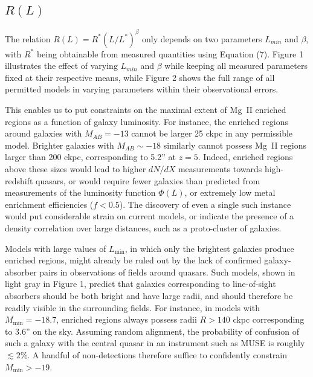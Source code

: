 \documentclass[useAMS,usenatbib]{mn2e}
\newcommand{\magtwo}{Mg~{\small II} }
\begin{document}
\subsection{$R(L)$}

The relation $R(L) = R^* (L/L^*)^\beta$ only depends on two parameters $L_{min}$ and $\beta$, with $R^*$ being obtainable from measured quantities using Equation (7). Figure 1 illustrates the effect of varying $L_{min}$ and $\beta$ while keeping all measured parameters fixed at their respective means, while Figure 2 shows the full range of all permitted models in varying parameters within their observational errors. 

This enables us to put constraints on the maximal extent of \magtwo enriched regions as a function of galaxy luminosity. For instance, the enriched regions around galaxies with $M_{AB} = -13$ cannot be larger 25 ckpc in any permissible model. Brighter galaxies with $M_{AB} \sim -18$ similarly cannot possess \magtwo regions larger than 200 ckpc, corresponding to 5.2'' at $z=5$. Indeed, enriched regions above these sizes would lead to higher $dN/dX$ measurements towards high-redshift quasars, or would require fewer galaxies than predicted from measurements of the luminosity function $\Phi(L)$, or extremely low metal enrichment efficiencies ($f<0.5$). The discovery of even a single such instance would put considerable strain on current models, or indicate the presence of a density correlation over large distances, such as a proto-cluster of galaxies.

Models with large values of $L_\text{min}$, in which only the brightest galaxies produce enriched regions, might already be ruled out by the lack of confirmed galaxy-absorber pairs in observations of fields around quasars. Such models, shown in light gray in Figure 1, predict that galaxies corresponding to line-of-sight absorbers should be both bright and have large radii, and should therefore be readily visible in the surrounding fields. For instance, in models with $M_\text{min} = -18.7$, enriched regions always possess radii $R>140$ ckpc corresponding to 3.6'' on the sky. Assuming random alignment, the probability of confusion of such a galaxy with the central quasar in an instrument such as MUSE is roughly $\lesssim2\%$. A handful of non-detections therefore suffice to confidently constrain $M_\text{min} > -19$.
\end{document}
